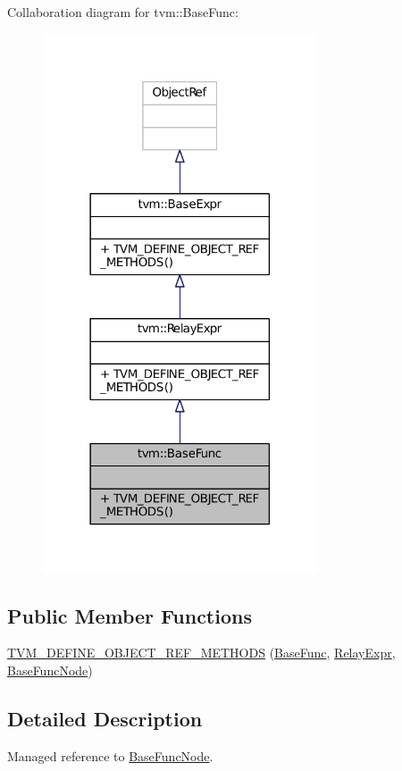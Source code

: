 Collaboration diagram for tvm\+:\+:Base\+Func\+:
\nopagebreak
\begin{figure}[H]
\begin{center}
\leavevmode
\includegraphics[width=230pt]{classtvm_1_1BaseFunc__coll__graph}
\end{center}
\end{figure}
\subsection*{Public Member Functions}
\begin{DoxyCompactItemize}
\item 
\hyperlink{classtvm_1_1BaseFunc_a7cadd404d82f2d6962373ac609a10501}{T\+V\+M\+\_\+\+D\+E\+F\+I\+N\+E\+\_\+\+O\+B\+J\+E\+C\+T\+\_\+\+R\+E\+F\+\_\+\+M\+E\+T\+H\+O\+DS} (\hyperlink{classtvm_1_1BaseFunc}{Base\+Func}, \hyperlink{classtvm_1_1RelayExpr}{Relay\+Expr}, \hyperlink{classtvm_1_1BaseFuncNode}{Base\+Func\+Node})
\end{DoxyCompactItemize}


\subsection{Detailed Description}
Managed reference to \hyperlink{classtvm_1_1BaseFuncNode}{Base\+Func\+Node}. 


